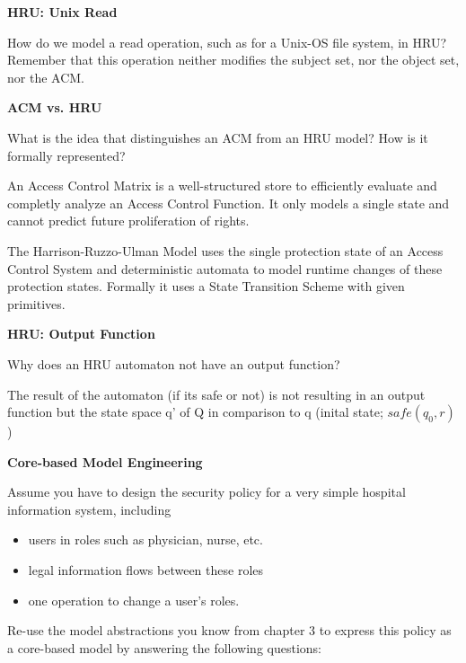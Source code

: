 \documentclass[10pt]{exam}  %
\begin{document}
\begin{questions}
    \question \textbf{HRU: Unix Read}\hfill

    How do we model a read operation, such as for a Unix-OS file system, in HRU? Remember that this operation neither modifies the subject set, nor the object set, nor the ACM.
    \begin{solution}
    \end{solution}

    \question \textbf{ACM vs. HRU}\hfill

    What is the idea that distinguishes an ACM from an HRU model? How is it formally represented?
    \begin{solution}
        An Access Control Matrix is a well-structured store to efficiently evaluate and completly analyze an Access Control Function. It only models a single state and cannot predict future proliferation of rights. 

        The Harrison-Ruzzo-Ulman Model uses the single protection state of an Access Control System and deterministic automata to model runtime changes of these protection states. Formally it uses a State Transition Scheme with given primitives.
    \end{solution}

    \question \textbf{HRU: Output Function}\hfill

    Why does an HRU automaton not have an output function?
    \begin{solution}
        The result of the automaton (if its safe or not) is not resulting in an output function but the state space q' of Q in comparison to q (inital state; $safe(q_0,r)$)
    \end{solution}

    \question \textbf{Core-based Model Engineering}\hfill

    Assume you have to design the security policy for a very simple hospital information system, including
    \begin{itemize}
        \item users in roles such as physician, nurse, etc.
        \item legal information flows between these roles
        \item one operation to change a user's roles.
    \end{itemize}
    Re-use the model abstractions you know from chapter 3 to express this policy as a core-based model by answering the following questions:
    \begin{parts}

\end{parts}
\end{questions}
\end{document}
